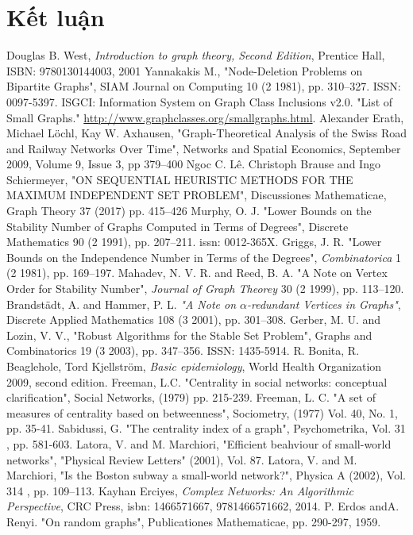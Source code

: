 \documentclass[14pt, oneside, a4paper, openany]{scrartcl}
\begin{document}
\newpage
\section{Kết luận}

\printindex
\newpage
\begin{thebibliography}{9}
	Douglas B. West,
	\textit{Introduction to graph theory, Second Edition},
	Prentice Hall, ISBN: 9780130144003, 2001
	Yannakakis M.,
	"Node-Deletion Problems on Bipartite Graphs",
	SIAM Journal on Computing 10 (2 1981), pp. 310–327. ISSN: 0097-5397.
	ISGCI: Information System on Graph Class Inclusions v2.0. "List of Small Graphs." \href{http://www.graphclasses.org/smallgraphs.html}{http://www.graphclasses.org/smallgraphs.html}.
	Alexander Erath, Michael Löchl, Kay W. Axhausen,
	"Graph-Theoretical Analysis of the Swiss Road and Railway Networks Over Time", 
	Networks and Spatial Economics,
	September 2009, Volume 9, Issue 3, pp 379–400
	Ngoc C. Lê. Christoph Brause and Ingo Schiermeyer,
	"ON SEQUENTIAL HEURISTIC METHODS FOR THE MAXIMUM INDEPENDENT SET PROBLEM",
	Discussiones Mathematicae, Graph Theory 37 (2017) pp. 415–426
	Murphy, O. J.
	"Lower Bounds on the Stability Number of Graphs Computed in Terms of Degrees", Discrete Mathematics 90 (2 1991), pp. 207–211. issn: 0012-365X. 
	Griggs, J. R.
	"Lower Bounds on the Independence Number in Terms of the Degrees",
	\textit{Combinatorica} 1 (2 1981), pp. 169–197.
	Mahadev, N. V. R. and Reed, B. A.
	"A Note on Vertex Order for Stability Number",
	\textit{Journal of Graph Theorey} 30 (2 1999), pp. 113–120.
	Brandstädt, A. and Hammer, P. L.
	\textit{"A Note on $\alpha$-redundant Vertices in Graphs"},
	Discrete Applied Mathematics 108 (3 2001), pp. 301–308.
	Gerber, M. U. and Lozin, V. V.,
	"Robust Algorithms for the Stable Set Problem",
	Graphs and Combinatorics 19 (3 2003), pp. 347–356. ISSN: 1435-5914.
	R. Bonita, R. Beaglehole, Tord Kjellström,
	\textit{Basic epidemiology},
	World Health Organization 2009, second edition.
	Freeman, L.C.
	"Centrality in social networks: conceptual clarification",
	Social Networks, (1979) pp. 215-239.
	Freeman, L. C.
	"A set of measures of centrality based on betweenness",
	Sociometry, (1977) Vol. 40, No. 1, pp. 35-41.
	Sabidussi, G. 
	"The centrality index of a graph",
	 Psychometrika, Vol. 31 , pp. 581-603.
	 Latora, V. and M. Marchiori,
	 "Efficient beahviour of small-world networks",
	 "Physical Review Letters" (2001), Vol. 87.
	 Latora, V. and M. Marchiori, 
	 "Is the Boston subway a small-world network?",
	 Physica A (2002), Vol. 314 , pp. 109–113.
	 Kayhan Erciyes,
	 \textit{Complex Networks: An Algorithmic Perspective},
	 CRC Press, isbn: 1466571667, 9781466571662, 2014.
	 P. Erdos andA. Renyi.
	 "On random graphs",
	 Publicationes Mathematicae, pp. 290-297, 1959.
\end{thebibliography}
\end{document}

